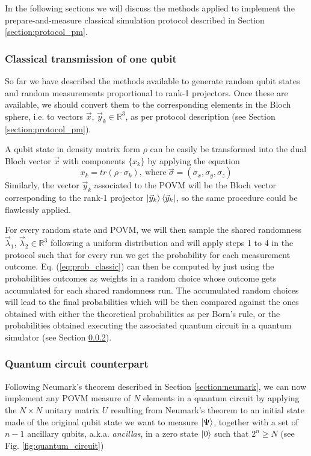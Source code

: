 In the following sections we will discuss the methods applied to implement the prepare-and-measure classical simulation protocol described in Section \ref{section:protocol_pm}.
\subsubsection{Classical transmission of one qubit}
So far we have described the methods available to generate random qubit states and random measurements proportional to rank-1 projectors. Once these are available, we should convert them to the corresponding elements in the Bloch sphere, i.e. to vectors $\vec{x}$, ${\vec{y}_k} \in \mathbb{R}^3$, as per protocol description (see Section \ref{section:protocol_pm}). 

A qubit state in density matrix form $\rho$ can be easily be transformed into the dual Bloch vector $\vec{x}$ with components $\{x_k\}$ by applying the equation
\begin{equation}
    x_k = tr(\rho \cdot \sigma_k),\ \text{where}\ \vec{\sigma} = (\sigma_x, \sigma_y, \sigma_z)
\end{equation}
Similarly, the vector ${\vec{y}_k}$ associated to the POVM will be the Bloch vector corresponding to the rank-1 projector $ \ket{\vec{y}_k} \bra{\vec{y}_k}$, so the same procedure could be flawlessly applied.

For every random state and POVM, we will then sample the shared randomness $\vec{\lambda}_1$, $\vec{\lambda}_2 \in \mathbb{R}^3$ following a uniform distribution and will apply steps 1 to 4 in the protocol such that for every run we get the probability for each measurement outcome. Eq. (\ref{eq:prob_classic}) can then be computed by just using the probabilities outcomes as weights in a random choice whose outcome gets accumulated for each shared randomness run. The accumulated random choices will lead to the final probabilities which will be then compared against the ones obtained with either the theoretical probabilities as per Born's rule, or the probabilities obtained executing the associated quantum circuit in a quantum simulator (see Section \ref{section:quantum_circuit}).

\subsubsection{Quantum circuit counterpart}\label{section:quantum_circuit}
Following Neumark's theorem described in Section \ref{section:neumark}, we can now implement any POVM measure of $N$ elements in a quantum circuit by applying the $N\times N$ unitary matrix $U$ resulting from Neumark's theorem to an initial state made of the original qubit state we want to measure $\ket{\Psi}$, together with a set of $n-1$ ancillary qubits, a.k.a. \textit{ancillas}, in a zero state $\ket{0}$ such that $2^n \ge N$ (see Fig. \ref{fig:quantum_circuit}) 

